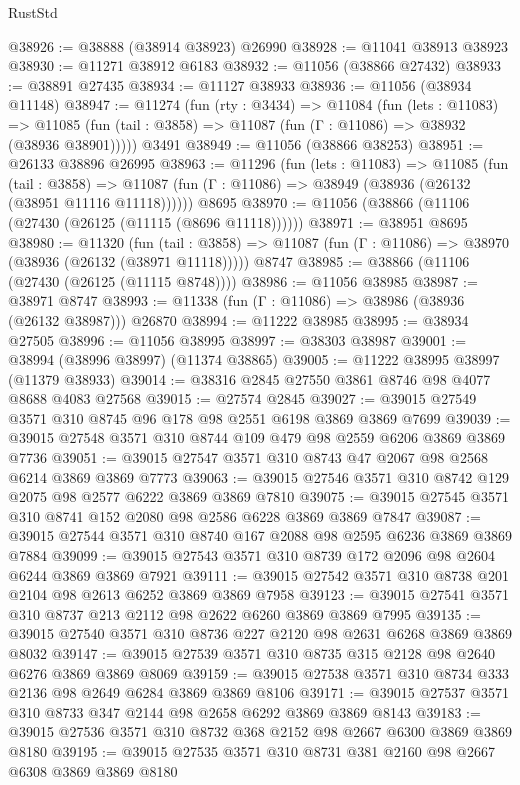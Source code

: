 \begin{lexlean}{RustStd}
\begin{coremodule}
@38926 := @38888 (@38914 @38923) @26990
@38928 := @11041 @38913 @38923
@38930 := @11271 @38912 @6183
@38932 := @11056 (@38866 @27432)
@38933 := @38891 @27435
@38934 := @11127 @38933
@38936 := @11056 (@38934 @11148)
@38947 := @11274
    (fun (rty : @3434) =>
    @11084
      (fun (lets : @11083) =>
      @11085 (fun (tail : @3858) => @11087 (fun (Γ : @11086) => @38932 (@38936 @38901)))))
    @3491
@38949 := @11056 (@38866 @38253)
@38951 := @26133 @38896 @26995
@38963 := @11296
    (fun (lets : @11083) =>
    @11085
      (fun (tail : @3858) =>
      @11087 (fun (Γ : @11086) => @38949 (@38936 (@26132 (@38951 @11116 @11118))))))
    @8695
@38970 := @11056 (@38866 (@11106 (@27430 (@26125 (@11115 (@8696 @11118))))))
@38971 := @38951 @8695
@38980 := @11320
    (fun (tail : @3858) => @11087 (fun (Γ : @11086) => @38970 (@38936 (@26132 (@38971 @11118)))))
    @8747
@38985 := @38866 (@11106 (@27430 (@26125 (@11115 @8748))))
@38986 := @11056 @38985
@38987 := @38971 @8747
@38993 := @11338 (fun (Γ : @11086) => @38986 (@38936 (@26132 @38987))) @26870
@38994 := @11222 @38985
@38995 := @38934 @27505
@38996 := @11056 @38995
@38997 := @38303 @38987
@39001 := @38994 (@38996 @38997) (@11374 @38865)
@39005 := @11222 @38995 @38997 (@11379 @38933)
@39014 := @38316 @2845 @27550 @3861 @8746 @98 @4077 @8688 @4083 @27568
@39015 := @27574 @2845
@39027 := @39015 @27549 @3571 @310 @8745 @96 @178 @98 @2551 @6198 @3869 @3869 @7699
@39039 := @39015 @27548 @3571 @310 @8744 @109 @479 @98 @2559 @6206 @3869 @3869 @7736
@39051 := @39015 @27547 @3571 @310 @8743 @47 @2067 @98 @2568 @6214 @3869 @3869 @7773
@39063 := @39015 @27546 @3571 @310 @8742 @129 @2075 @98 @2577 @6222 @3869 @3869 @7810
@39075 := @39015 @27545 @3571 @310 @8741 @152 @2080 @98 @2586 @6228 @3869 @3869 @7847
@39087 := @39015 @27544 @3571 @310 @8740 @167 @2088 @98 @2595 @6236 @3869 @3869 @7884
@39099 := @39015 @27543 @3571 @310 @8739 @172 @2096 @98 @2604 @6244 @3869 @3869 @7921
@39111 := @39015 @27542 @3571 @310 @8738 @201 @2104 @98 @2613 @6252 @3869 @3869 @7958
@39123 := @39015 @27541 @3571 @310 @8737 @213 @2112 @98 @2622 @6260 @3869 @3869 @7995
@39135 := @39015 @27540 @3571 @310 @8736 @227 @2120 @98 @2631 @6268 @3869 @3869 @8032
@39147 := @39015 @27539 @3571 @310 @8735 @315 @2128 @98 @2640 @6276 @3869 @3869 @8069
@39159 := @39015 @27538 @3571 @310 @8734 @333 @2136 @98 @2649 @6284 @3869 @3869 @8106
@39171 := @39015 @27537 @3571 @310 @8733 @347 @2144 @98 @2658 @6292 @3869 @3869 @8143
@39183 := @39015 @27536 @3571 @310 @8732 @368 @2152 @98 @2667 @6300 @3869 @3869 @8180
@39195 := @39015 @27535 @3571 @310 @8731 @381 @2160 @98 @2667 @6308 @3869 @3869 @8180

\end{coremodule}
\end{lexlean}
